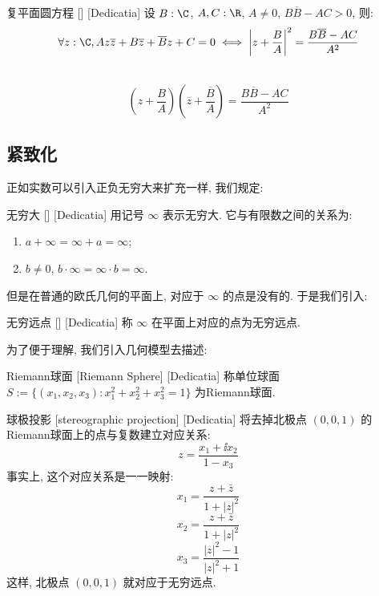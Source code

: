 \documentclass[UTF8]{ctexart}
\begin{document}
        \begin{thm}
            {复平面圆方程}
            []
            [Dedicatia]
            设 \(B:\C\), \(A, C:\R\), \(A\neq 0\), \(B\overline{B}-AC>0\), 则: 
            \[\forall z:\C, Az\overline{z}+B\overline{z}+\overline{B}z+C=0\iff\left|z+\frac{B}{A}\right|^2=\frac{B\overline{B}-AC}{A^2}\]
        \end{thm}
        
        \begin{prf}\
            \[\left(z+\frac{B}{A}\right)\left(\overline{z}+\frac{\overline{B}}{A}\right)=\frac{B\overline{B}-AC}{A^2}\]
        \end{prf}
    
    \subsection{紧致化}

        正如实数可以引入正负无穷大来扩充一样, 我们规定: 

        \begin{dfn}
            [UUID]
            {无穷大}
            []
            [Dedicatia]
            用记号 \(\infty\) 表示无穷大. 它与有限数之间的关系为:
            \begin{enumerate}
                \item  \(a+\infty=\infty+a=\infty\);
                \item  \(b\neq 0\),  \(b\cdot\infty=\infty\cdot b=\infty\).
            \end{enumerate}
        \end{dfn}

        但是在普通的欧氏几何的平面上, 对应于 \(\infty\) 的点是没有的. 于是我们引入: 

        \begin{dfn}
            [UUID]
            {无穷远点}
            []
            [Dedicatia]
            称 \(\infty\) 在平面上对应的点为无穷远点. 
        \end{dfn}

        为了便于理解, 我们引入几何模型去描述: 

        \begin{dfn}
            [UUID]
            {Riemann球面}
            [Riemann Sphere]
            [Dedicatia]
            称单位球面 \(S:=\{(x_1,x_2,x_3):x_1^2+x_2^2+x_3^2=1\}\) 为Riemann球面. 
        \end{dfn}

        \begin{ppt}
            [UUID]
            {球极投影}
            [stereographic projection]
            [Dedicatia]
            将去掉北极点 \((0,0,1)\) 的Riemann球面上的点与复数建立对应关系: 
            \[z=\frac{x_1+\ii x_2}{1-x_3}\]
            事实上, 这个对应关系是一一映射: 
            \[x_1=\frac{z+\bar{z}}{1+|z|^2}\]
            \[x_2=\frac{z+\bar{z}}{1+|z|^2}\]
            \[x_3=\frac{|z|^2-1}{|z|^2+1}\]
            这样, 北极点 \((0,0,1)\) 就对应于无穷远点. 
        \end{ppt}
\end{document}
